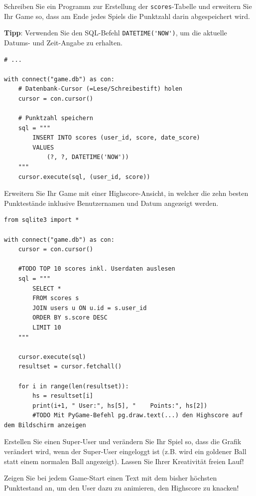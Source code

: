 \begin{myexercise}
    Schreiben Sie ein Programm zur Erstellung der \texttt{scores}-Tabelle und erweitern Sie Ihr Game so, dass am Ende jedes Spiels die Punktzahl darin abgespeichert wird.

    \textbf{Tipp}: Verwenden Sie den SQL-Befehl \lstinline[style=sql]|DATETIME('NOW')|, um die aktuelle Datums- und Zeit-Angabe zu erhalten.
    \begin{myanswer}
        \begin{lstlisting}
# ...

with connect("game.db") as con:
    # Datenbank-Cursor (=Lese/Schreibestift) holen
    cursor = con.cursor()

    # Punktzahl speichern
    sql = """
        INSERT INTO scores (user_id, score, date_score)
        VALUES
            (?, ?, DATETIME('NOW'))
    """
    cursor.execute(sql, (user_id, score))

\end{lstlisting}
    \end{myanswer}
\end{myexercise}

\begin{myexercise}
    Erweitern Sie Ihr Game mit einer Highscore-Ansicht, in welcher die zehn besten Punktestände inklusive Benutzernamen und Datum angezeigt werden.
    \begin{myanswer}
        \begin{lstlisting}
from sqlite3 import *

with connect("game.db") as con:
    cursor = con.cursor()

    #TODO TOP 10 scores inkl. Userdaten auslesen
    sql = """
        SELECT *
        FROM scores s
        JOIN users u ON u.id = s.user_id
        ORDER BY s.score DESC
        LIMIT 10
    """

    cursor.execute(sql)
    resultset = cursor.fetchall()

    for i in range(len(resultset)):
        hs = resultset[i]
        print(i+1, " User:", hs[5], "    Points:", hs[2])
        #TODO Mit PyGame-Befehl pg.draw.text(...) den Highscore auf dem Bildschirm anzeigen
\end{lstlisting}
    \end{myanswer}

\end{myexercise}

\begin{mychallenge}
    Erstellen Sie einen Super-User und verändern Sie Ihr Spiel so, dass die Grafik verändert wird, wenn der Super-User eingeloggt ist (z.B. wird ein goldener Ball statt einem normalen Ball angezeigt). Lassen Sie Ihrer Kreativität freien Lauf!
\end{mychallenge}

\begin{mychallenge}
    Zeigen Sie bei jedem Game-Start einen Text mit dem bisher höchsten Punktestand an, um den User dazu zu animieren, den Highscore zu knacken!
\end{mychallenge}